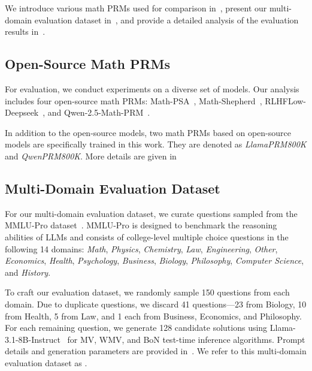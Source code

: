 

We introduce various math PRMs used for comparison in~, present our multi-domain evaluation dataset in~, and provide a detailed analysis of the evaluation results in~.


\subsection{Open-Source Math PRMs}
\label{sec:existing-mathprm}



For evaluation,
we conduct experiments on a diverse set of models.
Our analysis includes four open-source math PRMs:
Math-PSA~\citep{wang2024openr},
Math-Shepherd~\citep{wang2024math},
RLHFLow-Deepseek~\citep{xiong2024rlhflowmath},
and Qwen-2.5-Math-PRM~\citep{zheng2024processbench}.


In addition to the open-source models,
two math PRMs based on open-source models are specifically trained in this work.
They are denoted as \emph{LlamaPRM800K} and \emph{QwenPRM800K}. More details are given in~



\subsection{Multi-Domain Evaluation Dataset}
\label{sec:mmlu-eval}


For our multi-domain evaluation dataset, we curate questions sampled from the MMLU-Pro dataset~\citep{wang2024mmlupro}.
MMLU-Pro is designed to benchmark the reasoning abilities of LLMs and consists of college-level multiple choice questions in the following 14 domains:
\emph{Math}, \emph{Physics}, \emph{Chemistry}, \emph{Law}, \emph{Engineering}, \emph{Other}, \emph{Economics}, \emph{Health}, \emph{Psychology}, \emph{Business}, \emph{Biology}, \emph{Philosophy}, \emph{Computer Science}, and \emph{History}.


To craft our evaluation dataset, we randomly sample 150 questions from each domain. Due to duplicate questions, we discard 41 questions---23 from Biology, 10 from Health, 5 from Law, and 1 each from Business, Economics, and Philosophy. For each remaining question, we generate 128 candidate solutions using Llama-3.1-8B-Instruct~\citep{dubey2024llama} for MV, WMV, and BoN test-time inference algorithms.
Prompt details and generation parameters are provided in~.
We refer to this multi-domain evaluation dataset as \emph{\ourdataeval}.



